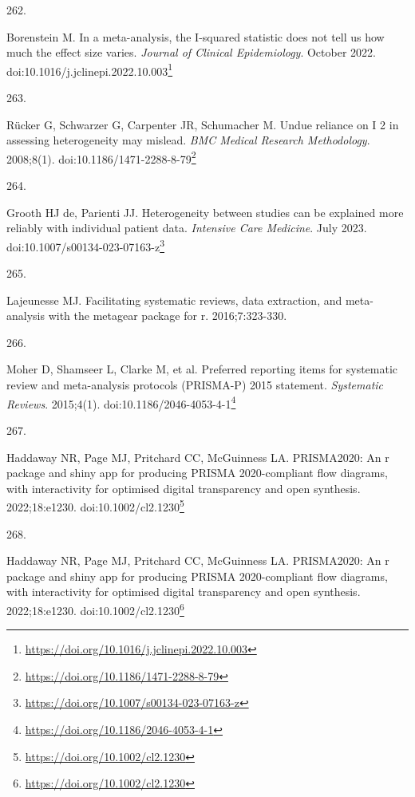 \documentclass[
  a4paper,
]{book}
\newlength{\cslhangindent}
\newlength{\csllabelwidth}
\newlength{\cslentryspacingunit} %
\newenvironment{CSLReferences}[2] %
 {%
  \setlength{\parindent}{0pt}
  \ifodd #1
  \let\oldpar\par
  \def\par{\hangindent=\cslhangindent\oldpar}
  \fi
  \setlength{\parskip}{#2\cslentryspacingunit}
 }%
 {}
\newcommand{\CSLLeftMargin}[1]{\parbox[t]{\csllabelwidth}{#1}}
\newcommand{\CSLRightInline}[1]{\parbox[t]{\linewidth - \csllabelwidth}{#1}\break}
\renewcommand{\href}[2]{#2\footnote{\url{#1}}}
\begin{document}
\begin{CSLReferences}{0}{0}
\leavevmode{}%
\CSLLeftMargin{262. }%
\CSLRightInline{Borenstein M. In a meta-analysis, the I-squared statistic does not tell us how much the effect size varies. \emph{Journal of Clinical Epidemiology}. October 2022. doi:\href{https://doi.org/10.1016/j.jclinepi.2022.10.003}{10.1016/j.jclinepi.2022.10.003}}

\leavevmode{}%
\CSLLeftMargin{263. }%
\CSLRightInline{Rücker G, Schwarzer G, Carpenter JR, Schumacher M. Undue reliance on I 2 in assessing heterogeneity may mislead. \emph{BMC Medical Research Methodology}. 2008;8(1). doi:\href{https://doi.org/10.1186/1471-2288-8-79}{10.1186/1471-2288-8-79}}

\leavevmode{}%
\CSLLeftMargin{264. }%
\CSLRightInline{Grooth HJ de, Parienti JJ. Heterogeneity between studies can be explained more reliably with individual patient data. \emph{Intensive Care Medicine}. July 2023. doi:\href{https://doi.org/10.1007/s00134-023-07163-z}{10.1007/s00134-023-07163-z}}

\leavevmode{}%
\CSLLeftMargin{265. }%
\CSLRightInline{Lajeunesse MJ. Facilitating systematic reviews, data extraction, and meta-analysis with the metagear package for r. 2016;7:323-330.}

\leavevmode{}%
\CSLLeftMargin{266. }%
\CSLRightInline{Moher D, Shamseer L, Clarke M, et al. Preferred reporting items for systematic review and meta-analysis protocols (PRISMA-P) 2015 statement. \emph{Systematic Reviews}. 2015;4(1). doi:\href{https://doi.org/10.1186/2046-4053-4-1}{10.1186/2046-4053-4-1}}

\leavevmode{}%
\CSLLeftMargin{267. }%
\CSLRightInline{Haddaway NR, Page MJ, Pritchard CC, McGuinness LA. PRISMA2020: An r package and shiny app for producing PRISMA 2020-compliant flow diagrams, with interactivity for optimised digital transparency and open synthesis. 2022;18:e1230. doi:\href{https://doi.org/10.1002/cl2.1230}{10.1002/cl2.1230}}

\leavevmode{}%
\CSLLeftMargin{268. }%
\CSLRightInline{Haddaway NR, Page MJ, Pritchard CC, McGuinness LA. PRISMA2020: An r package and shiny app for producing PRISMA 2020-compliant flow diagrams, with interactivity for optimised digital transparency and open synthesis. 2022;18:e1230. doi:\href{https://doi.org/10.1002/cl2.1230}{10.1002/cl2.1230}}


\end{CSLReferences}
\end{document}
